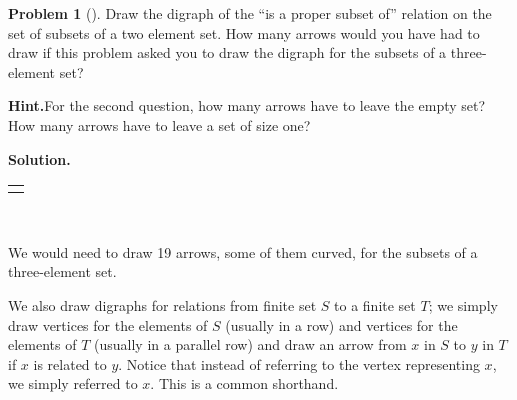 \documentclass[10pt,]{book}
\theoremstyle{plain}
\theoremstyle{definition}
\newtheorem{activity}[project]{Problem}
\theoremstyle{definition}
\numberwithin{equation}{chapter}
\newlength{\panelmax}
\begin{document}
\begin{activity}[]\label{activity-332}
Draw the digraph of the ``is a proper subset of'' relation on the set of subsets of a two element set. How many arrows would you have had to draw if this problem asked you to draw the digraph for the subsets of a three-element set?%
\par\medskip\noindent%
\textbf{Hint.}\quad For the second question, how many arrows have to leave the empty set? How many arrows have to leave a set of size one?%
\par\medskip\noindent%
\textbf{Solution.}\quad %
{%
\setlength{\panelmax}{0pt}
\newsavebox{\panelboxARimage}
\newlength{\phARimage}\setlength{\phARimage}{\ht\panelboxARimage+\dp\panelboxARimage}
\settototalheight{\phARimage}{\usebox{\panelboxARimage}}
\setlength{\panelmax}{\maxof{\panelmax}{\phARimage}}
\leavevmode%
\setlength{\tabcolsep}{0\linewidth}
\par\medskip\noindent
\hspace*{0.4\linewidth}%
\begin{tabular}{@{}*{1}{c}@{}}
\begin{minipage}[c][\panelmax][t]{0.2\linewidth}\usebox{\panelboxARimage}\end{minipage}\end{tabular}\\
}%
\par
We would need to draw 19 arrows, some of them curved, for the subsets of a three-element set.%
\end{activity}
We also draw digraphs for relations from finite set \(S\) to a finite set \(T\); we simply draw vertices for the elements of \(S\) (usually in a row) and vertices for the elements of \(T\) (usually in a parallel row) and draw an arrow from \(x\) in \(S\) to \(y\) in \(T\) if \(x\) is related to \(y\). Notice that instead of referring to the vertex representing \(x\), we simply referred to \(x\). This is a common shorthand.%
\end{document}
